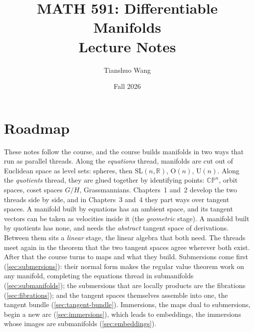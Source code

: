 \documentclass[11pt]{report}
\title{\textbf{MATH 591: Differentiable Manifolds} \\ \large Lecture Notes}
\author{Tianshuo Wang}
\date{Fall 2026}
\newcommand{\SL}{\mathrm{SL}}
\newcommand{\Ogp}{\mathrm{O}}
\newcommand{\Ugp}{\mathrm{U}}
\begin{document}
\maketitle

\begin{center}
\end{center}

\tableofcontents
\newpage

\chapter*{Roadmap}

These notes follow the course, and the course builds manifolds in two ways that run as parallel threads. Along the \emph{equations} thread, manifolds are cut out of Euclidean space as level sets: spheres, then $\SL(n,\mathbb{R})$, $\Ogp(n)$, $\Ugp(n)$. Along the \emph{quotients} thread, they are glued together by identifying points: $\mathbb{CP}^n$, orbit spaces, coset spaces $G/H$, Grassmannians. Chapters~1 and~2 develop the two threads side by side, and in Chapters~3 and~4 they part ways over tangent spaces. A manifold built by equations has an ambient space, and its tangent vectors can be taken as velocities inside it (the \emph{geometric} stage). A manifold built by quotients has none, and needs the \emph{abstract} tangent space of derivations. Between them sits a \emph{linear} stage, the linear algebra that both need. The threads meet again in the theorem that the two tangent spaces agree wherever both exist. After that the course turns to maps and what they build. Submersions come first (\ref{sec:submersions}): their normal form makes the regular value theorem work on any manifold, completing the equations thread in submanifolds (\ref{sec:submanifolds}); the submersions that are locally products are the fibrations (\ref{sec:fibrations}); and the tangent spaces themselves assemble into one, the tangent bundle (\ref{sec:tangent-bundle}). Immersions, the maps dual to submersions, begin a new arc (\ref{sec:immersions}), which leads to embeddings, the immersions whose images are submanifolds (\ref{sec:embeddings}).
\end{document}
